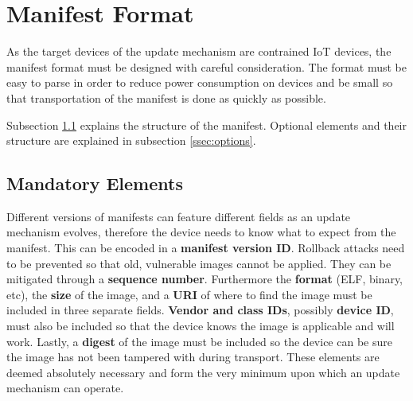 \documentclass[0-thesis.tex]{subfiles}
\begin{document}

\section{Manifest Format}
\label{sec:manifest-format}
As the target devices of the update mechanism are contrained IoT devices, the manifest
format must be designed with careful consideration. The format must be easy to parse in
order to reduce power consumption on devices and be small so that transportation of the
manifest is done as quickly as possible. %

Subsection \ref{ssec:mandatory-elements} explains the structure of the manifest. Optional
elements and their structure are explained in subsection \ref{ssec:options}. 

\subsection{Mandatory Elements}
\label{ssec:mandatory-elements}
Different versions of manifests can feature different fields as an update mechanism
evolves, therefore the device needs to know what to expect from the manifest. This can be
encoded in a \textbf{manifest version ID}. Rollback attacks need to be prevented so that
old, vulnerable images cannot be applied. They can be mitigated through a \textbf{sequence
number}. Furthermore the \textbf{format} (ELF, binary, etc), the \textbf{size} of the
image, and a \textbf{URI} of where to find the image must be included in three separate
fields. \textbf{Vendor and class IDs}, possibly \textbf{device ID}, must also be included
so that the device knows the image is applicable and will work. Lastly, a \textbf{digest}
of the image must be included so the device can be sure the image has not been tampered
with during transport. These elements are deemed absolutely necessary and form the very
minimum upon which an update mechanism can operate. 
\end{document}
